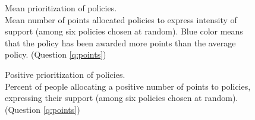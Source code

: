 \begin{figure}[h!] 
    \caption[Mean prioritization of policies]{Mean prioritization of policies. \\Mean number of points allocated policies to express intensity of support (among six policies chosen at random). Blue color means that the policy has been awarded more points than the average policy. (Question \ref{q:points})}\label{fig:points}
\end{figure}

\begin{figure}[h!] 
    \caption[Positive prioritization of policies]{Positive prioritization of policies. \\ Percent of people allocating a positive number of points to policies, expressing their support (among six policies chosen at random). (Question \ref{q:points})}\label{fig:points_positive}
\end{figure}

